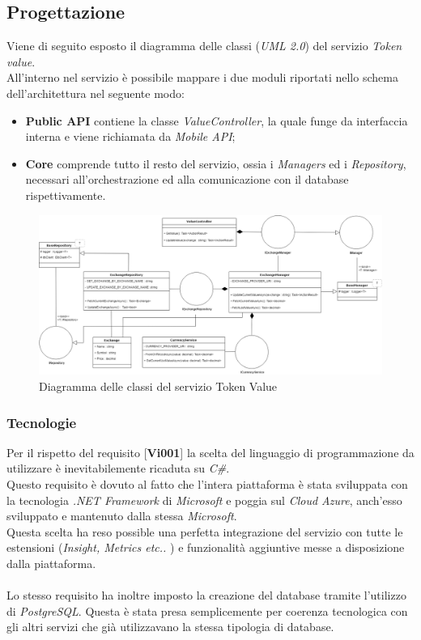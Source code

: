 \documentclass[11pt]{thesistemp}
\begin{document}
\subsection{Progettazione}
Viene di seguito esposto il diagramma delle classi (\textit{UML 2.0}) del servizio \textit{Token value}.\\
All'interno nel servizio è possibile mappare i due moduli riportati nello schema dell'architettura nel seguente modo:
\begin{itemize}
	\item \textbf{Public API} contiene la classe \textit{ValueController}, la quale funge da interfaccia interna e viene richiamata da \textit{Mobile API};
	\item \textbf{Core} comprende tutto il resto del servizio, ossia i \textit{Managers} ed i \textit{Repository}, necessari all'orchestrazione ed alla comunicazione con il database rispettivamente.
\end{itemize}
\begin{figure}[h]\hfill
    \centering
    \includegraphics[width=\textwidth]{TkUMLClassDiagram.png}
        \caption{Diagramma delle classi del servizio Token Value}
    \label{fig:TkUMLClassDiagram}
\end{figure}

\subsubsection{Tecnologie}

Per il rispetto del requisito [\textbf{Vi001}] la scelta del linguaggio di programmazione da utilizzare è inevitabilemente ricaduta su \textit{C\#}.\\
Questo requisito è dovuto al fatto che l'intera piattaforma è stata sviluppata con la tecnologia \textit{.NET Framework} di \textit{Microsoft} e poggia sul \textit{Cloud Azure}, anch'esso sviluppato e mantenuto dalla stessa \textit{Microsoft}.\\
Questa scelta ha reso possible una perfetta integrazione del servizio con tutte le estensioni (\textit{Insight, Metrics etc.. }) e funzionalità aggiuntive messe a disposizione dalla piattaforma.\\\\
Lo stesso requisito ha inoltre imposto la creazione del database tramite l'utilizzo di \textit{PostgreSQL}. Questa è stata presa semplicemente per coerenza tecnologica con gli altri servizi che già utilizzavano la stessa tipologia di database.
\end{document}
